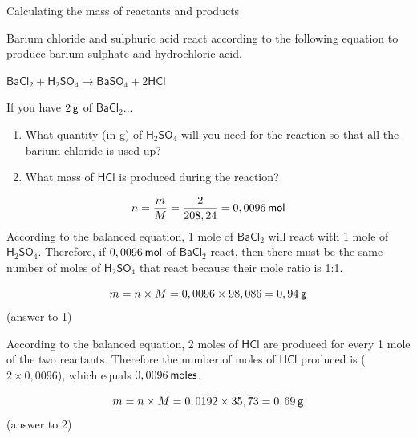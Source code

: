       \begin{wex}{ Calculating the mass of reactants and products }
{
      \label{m38717*id279063}Barium chloride and sulphuric acid react according to the following equation to produce barium sulphate and hydrochloric acid.\par 
      \label{m38717*id279070}
        ${\mathsf{BaCl}}_{2}+{\mathsf{H}}_{2}{\mathsf{SO}}_{4}\to {\mathsf{BaSO}}_{4}+2\mathsf{HCl}$
      \par 
      \label{m38717*id279141}If you have $2\phantom{\rule{2pt}{0ex}}\mathsf{g}$ of $\mathsf{BaCl}{}_{2}$...\par 
      \label{m38717*id279158}\begin{enumerate}[noitemsep, label=\textbf{\arabic*}. ] 
            \label{m38717*uid37}\item What quantity (in g) of $\mathsf{H}{}_{2}\mathsf{SO}{}_{4}$ will you need for the reaction so that all the barium chloride is used up?
\label{m38717*uid38}\item What mass of $\mathsf{HCl}$ is produced during the reaction?
\end{enumerate}
      \vspace{5pt}
}
{
        
    \begin{equation*}
    n=\frac{m}{M}=\frac{2}{208,24}=0,0096\phantom{\rule{2pt}{0ex}}\mathsf{mol}
      \end{equation*}
      \label{m38717*id279344}According to the balanced equation, 1 mole of $\mathsf{BaCl}{}_{2}$ will react with 1 mole of $\mathsf{H}{}_{2}\mathsf{SO}{}_{4}$. Therefore, if $0,0096\phantom{\rule{2pt}{0ex}}\mathsf{mol}$ of $\mathsf{BaCl}{}_{2}$ react, then there must be the same number of moles of $\mathsf{H}{}_{2}\mathsf{SO}{}_{4}$ that react because their mole ratio is 1:1.\par 
      \label{m38717*id279456}\nopagebreak\noindent{}
        
    \begin{equation*}
    m=n\ensuremath{\times}M=0,0096\ensuremath{\times}98,086=0,94\phantom{\rule{2pt}{0ex}}\mathsf{g}
      \end{equation*}
      \label{m38717*id279505}(answer to 1)\par 
      \label{m38717*id279513}According to the balanced equation, 2 moles of $\mathsf{HCl}$ are produced for every 1 mole of the two reactants. Therefore the number of moles of $\mathsf{HCl}$ produced is ($2\ensuremath{\times}0,0096$), which equals $0,0096\phantom{\rule{2pt}{0ex}}\mathsf{moles}$.\par 
      \label{m38717*id279531}\nopagebreak\noindent{}
        
    \begin{equation*}
    m=n\ensuremath{\times}M=0,0192\ensuremath{\times}35,73=0,69\phantom{\rule{2pt}{0ex}}\mathsf{g}
      \end{equation*}
      \label{m38717*id279580}(answer to 2)\par 
}
    \end{wex}
